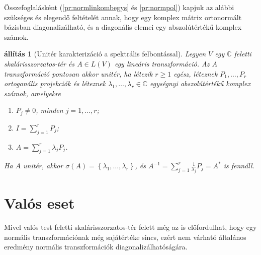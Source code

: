 \documentclass[a4paper, showtrims]{memoir}
\theoremstyle{plain}
\newtheorem{proposition}{állítás}[chapter]
\theoremstyle{remark}
\theoremstyle{definition}
\begin{document}
Összefoglalásként (\ref{pr:normlinkombegys} és \ref{pr:normpol}) kapjuk az alábbi szükséges és elegendő feltételét annak,
hogy egy komplex mátrix ortonormált bázisban diagonalizálható, és a diagonális elemei egy abszolútértékű komplex számok.
\begin{proposition}[Unitér karakterizáció a spektrális felbontással]
	Legyen $V$ egy $\mathbb{C}$ feletti ska\-lá\-ris\-szor\-za\-tos-tér és $A\in L\left( V \right)$ egy lineáris transzformáció.
	Az $A$ transzformáció pontosan akkor unitér,
	ha létezik $r\geq 1$ egész, léteznek $P_1,\ldots,P_r$ ortogonális projekciók és
	léteznek $\lambda_1,\ldots,\lambda_r\in\mathbb{C}$ egységnyi abszolútértékű komplex számok,
	amelyekre
	\begin{enumerate}
		\item $P_j\neq 0$, minden $j=1,\ldots,r$;
		\item $I=\sum_{j=1}^rP_j$;
		\item $A=\sum_{j=1}^r\lambda_jP_j$.
	\end{enumerate}
	Ha $A$ unitér,
	akkor $\sigma\left( A \right)=\left\{ \lambda_1,\ldots,\lambda_r \right\}$,
	és $A^{-1}=\sum_{j=1}^r\frac{1}{\lambda_j}P_j=A^\ast$ is fennáll.
\end{proposition}




\section{Valós eset}
Mivel valós test feletti skalárisszorzatos-tér felett még az is előfordulhat,
hogy egy normális transzformációnak még sajátértéke sincs,
ezért nem várható általános eredmény normális transzformációk diagonalizálhatóságára.
\end{document}
